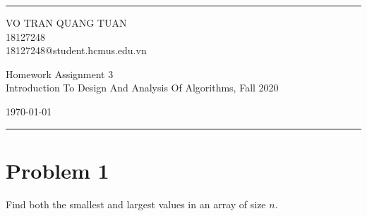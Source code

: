 \documentclass[a4paper]{article}
\begin{document}

\fancyhead[C]{}
\hrule \medskip %
\begin{minipage}{0.295\textwidth} 
\raggedright
\footnotesize
VO TRAN QUANG TUAN \hfill\\   
18127248\hfill\\
18127248@student.hcmus.edu.vn
\end{minipage}
\begin{minipage}{0.4\textwidth} 
\centering 
\large 
Homework Assignment 3\\ 
\normalsize 
Introduction To Design And Analysis Of Algorithms, Fall 2020\\ 
\end{minipage}
\begin{minipage}{0.295\textwidth} 
\raggedleft
\today\hfill\\
\end{minipage}
\medskip\hrule 
\bigskip

\tableofcontents
\newpage
\section{Problem 1}
Find both the smallest and largest values in an array of size $n$. \par
\end{document}
